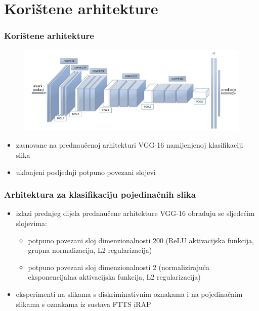 \documentclass{beamer}
\begin{document}
\section{Korištene arhitekture}
\begin{frame}
\frametitle{Korištene arhitekture}
 \begin{figure}[H]
\centering
\includegraphics[scale=0.5]{images/vgg_architecture.png}
\end{figure} 
\begin{itemize}
 \item zasnovane na prednaučenoj arhitekturi VGG-16 namijenjenoj klasifikaciji slika 
 \item uklonjeni posljednji potpuno povezani slojevi
\end{itemize}
\end{frame}

\begin{frame}
\frametitle{Arhitektura za klasifikaciju pojedinačnih slika}
 \begin{itemize}
  \item izlazi prednjeg dijela prednaučene arhitekture VGG-16 obrađuju se sljedećim slojevima:
  \begin{itemize}
   \item potpuno povezani sloj dimenzionalnosti 200 (ReLU aktivacijska funkcija, grupna normalizacija, L2 regularizacija)
   \item potpuno povezani sloj dimenzionalnosti 2 (normalizirajuća eksponencijalna aktivacijska funkcija, L2 regularizacija)
  \end{itemize}
  \item eksperimenti na slikama s diskriminativnim oznakama i na pojedinačnim slikama s oznakama iz sustava FTTS iRAP
 \end{itemize}

\end{frame}
\end{document}
